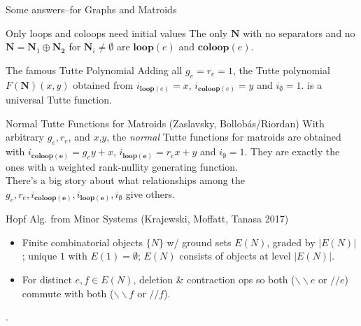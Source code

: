 \documentclass{beamer}
\newcommand{\ext}[1]{\ensuremath{\mathbf{#1}}}
\begin{document}
\begin{frame}{Some answers--for Graphs and Matroids}

  \begin{block}{Only loops and coloops need initial values}
    The only
    $\ext{N}$ with no separators and no $\ext{N}=\ext{N}_1\oplus\ext{N_2}$
    for $\ext{N}_i\neq\emptyset$ are $\mathbf{loop}(e)$
    and $\mathbf{coloop}(e)$.
  \end{block}


  \begin{block}{The famous Tutte Polynomial}
  Adding all $g_e=r_e=1$, the Tutte polynomial $F(\ext{N})(x,y)$
  obtained from $i_{\mathbf{loop}(e)}=x$, 
  $i_{\mathbf{coloop}(e)}=y$ and $i_{\mathbf{\emptyset}}=1$.
  is a universal Tutte function.
  \end{block}
  
  \begin{block}{Normal Tutte Functions for Matroids}
    (Zaslavsky, Bollob\'{a}s/Riordan) With arbitrary $g_e,r_e$, and $x$,$y$, the \emph{normal} Tutte functions
    for matroids are obtained with $i_{\mathbf{coloop(e)}}=g_ey + x$,
  $i_{\mathbf{loop(e)}}=r_ex + y$ and  $i_{\mathbf{\emptyset}}=1$.
    They are exactly the ones with a weighted rank-nullity generating function.\\
    There's a big story about what relationships among the
    $g_e, r_e, i_{\mathbf{coloop(e)}} ,i_{\mathbf{loop(e)}}, i_\emptyset$ give others.
  \end{block}

\end{frame}

\begin{frame}{Hopf Alg. from Minor Systems (Krajewski, Moffatt, Tanasa 2017)}
  \begin{definition}
    \begin{itemize}
      \item
    Finite combinatorial objects $\{N\}$  w/ ground sets $E(N)$, graded by
    $|E(N)|$; unique $1$ with $E(1)=\emptyset$; $E(N)$ consists of objects at level $|E(N)|$.
  \item
    For distinct $e,f\in E(N)$, deletion \& contraction ops so both ($\backslash\backslash e$ or $// e$) commute
    with both ($\backslash\backslash f$ or $// f$).
    \end{itemize}.
  \end{definition}


\end{frame}
\end{document}
